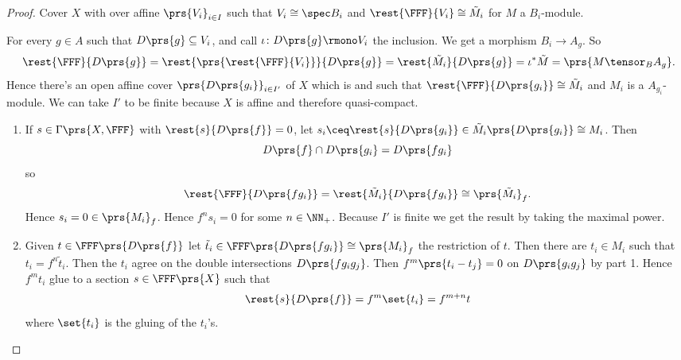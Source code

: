 \documentclass[10pt,a4paper,twoside,openany,hidelinks]{book}
\begin{document}
\begin{proof}
Cover $X$ with over affine $\prs{V_i}_{i \in I}$ such that $V_i \cong \spec B_i$ and $\rest{\FFF}{V_i} \cong \tilde{M}_i$ for $M$ a $B_i$-module.

For every $g \in A$ such that $D\prs{g} \subseteq V_i$, and call $\iota \colon D\prs{g} \rmono V_i$ the inclusion. We get a morphism $B_i \to A_g$.
So \[\rest{\FFF}{D\prs{g}} = \rest{\prs{\rest{\FFF}{V_i}}}{{D\prs{g}}} = \rest{\tilde{M_i}}{D\prs{g}} = \iota^*\tilde{M} = \prs{M \tensor_B A_g} \text{.}\]
Hence there's an open affine cover $\prs{D\prs{g_i}}_{i \in I'}$ of $X$ which is and such that $\rest{\FFF}{D\prs{g_i}} \cong \tilde{M}_i$ and $M_i$ is a $A_{g_i}$-module. We can take $I'$ to be finite because $X$ is affine and therefore quasi-compact.

\begin{enumerate}
\item If $s \in \Gamma\prs{X,\FFF}$ with $\rest{s}{D\prs{f}} = 0$, let $s_i \ceq \rest{s}{D\prs{g_i}} \in \tilde{M}_i \prs{D\prs{g_i}} \cong M_i$.
Then
\[D\prs{f} \cap D\prs{g_i} = D\prs{f g_i}\]
so
\[\rest{\FFF}{D\prs{f g_i}} = \rest{\tilde{M}_i}{D\prs{f g_i}} \cong \prs{\tilde{M}_i}_f \text{.}\]
Hence $s_i = 0 \in \prs{M_i}_f$. Hence $f^n s_i = 0$ for some $n \in \NN_+$. Because $I'$ is finite we get the result by taking the maximal power.

\item Given $t \in \FFF\prs{D\prs{f}}$ let $\tilde{t}_i \in \FFF\prs{D\prs{f g_i}} \cong \prs{M_i}_f$ the restriction of $t$.
Then there are $t_i \in M_i$ such that $t_i = f^n \tilde{t}_i$. Then the $t_i$ agree on the double intersections $D\prs{f g_i g_j}$.
Then $f^m \prs{t_i - t_j} = 0$ on $D\prs{g_i g_j}$ by part 1.
Hence $f^m t_i$ glue to a section $s \in \FFF\prs{X}$ such that \[\rest{s}{D\prs{f}} = f^m \set{t_i} = f^{m+n} t\]
where $\set{t_i}$ is the gluing of the $t_i$'s.
\end{enumerate}
\end{proof}


\backmatter
\end{document}
